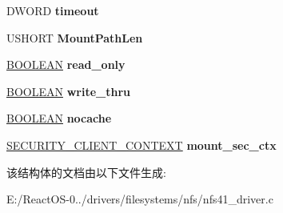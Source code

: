 \begin{DoxyCompactItemize}
\item 
\mbox{\label{struct___n_f_s41___v___n_e_t___r_o_o_t___e_x_t_e_n_s_i_o_n_a76ba8f24af3d503c98350db724ce5023}} 
D\+W\+O\+RD {\bfseries timeout}
\item 
\mbox{\label{struct___n_f_s41___v___n_e_t___r_o_o_t___e_x_t_e_n_s_i_o_n_ac94c3d59df8cfdb88c1562ac22071d5a}} 
U\+S\+H\+O\+RT {\bfseries Mount\+Path\+Len}
\item 
\mbox{\label{struct___n_f_s41___v___n_e_t___r_o_o_t___e_x_t_e_n_s_i_o_n_ad4d3e9a9ec94c2c9ef1cf489558145d3}} 
\hyperlink{_processor_bind_8h_a112e3146cb38b6ee95e64d85842e380a}{B\+O\+O\+L\+E\+AN} {\bfseries read\+\_\+only}
\item 
\mbox{\label{struct___n_f_s41___v___n_e_t___r_o_o_t___e_x_t_e_n_s_i_o_n_a6b3f33ee99db5be43a6ff75d9e716f2d}} 
\hyperlink{_processor_bind_8h_a112e3146cb38b6ee95e64d85842e380a}{B\+O\+O\+L\+E\+AN} {\bfseries write\+\_\+thru}
\item 
\mbox{\label{struct___n_f_s41___v___n_e_t___r_o_o_t___e_x_t_e_n_s_i_o_n_a908b2b94e0d8e7cf8337cfa148f50ea7}} 
\hyperlink{_processor_bind_8h_a112e3146cb38b6ee95e64d85842e380a}{B\+O\+O\+L\+E\+AN} {\bfseries nocache}
\item 
\mbox{\label{struct___n_f_s41___v___n_e_t___r_o_o_t___e_x_t_e_n_s_i_o_n_af6c448fc5d9b65aa88f37a250c474306}} 
\hyperlink{struct___s_e_c_u_r_i_t_y___c_l_i_e_n_t___c_o_n_t_e_x_t}{S\+E\+C\+U\+R\+I\+T\+Y\+\_\+\+C\+L\+I\+E\+N\+T\+\_\+\+C\+O\+N\+T\+E\+XT} {\bfseries mount\+\_\+sec\+\_\+ctx}
\end{DoxyCompactItemize}


该结构体的文档由以下文件生成\+:\begin{DoxyCompactItemize}
\item 
E\+:/\+React\+O\+S-\/0../drivers/filesystems/nfs/nfs41\+\_\+driver.\+c\end{DoxyCompactItemize}
